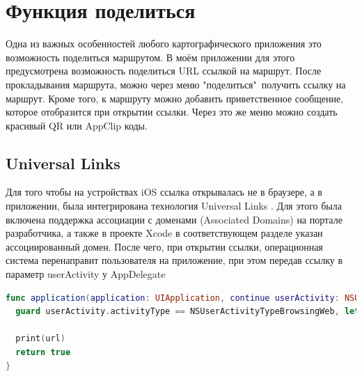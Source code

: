\chapter{Функция поделиться}
  Одна из важных особенностей любого картографического приложения это возможность поделиться маршрутом. В моём приложении для этого предусмотрена возможность поделиться URL ссылкой на маршрут. После прокладывания маршрута, можно через меню "поделиться"\ получить ссылку на маршрут. Кроме того, к маршруту можно добавить приветственное сообщение, которое отобразится при открытии ссылки. Через это же меню можно создать красивый QR или AppClip коды.

  \section{Universal Links}
    Для того чтобы на устройствах iOS ссылка открывалась не в браузере, а в приложении, была интегрирована технология Universal Links \cite{UniversalLinks}. Для этого была включена поддержка ассоциации с доменами (Associated Domains) на портале разработчика, а также в проекте Xcode в соответствующем разделе указан ассоциированный домен. После чего, при открытии ссылки, операционная система перенаправит пользователя на приложение, при этом передав ссылку в параметр userActivity у AppDelegate

    \begin{lstlisting}[language=swift,caption={Получение ссылки из Universal Links}]
func application(application: UIApplication, continue userActivity: NSUserActivity, restorationHandler: [Any?] -> Void) -> Bool {
  guard userActivity.activityType == NSUserActivityTypeBrowsingWeb, let url = userActivity.webpageURL else { return false }

  print(url)
  return true
}
    \end{lstlisting}

